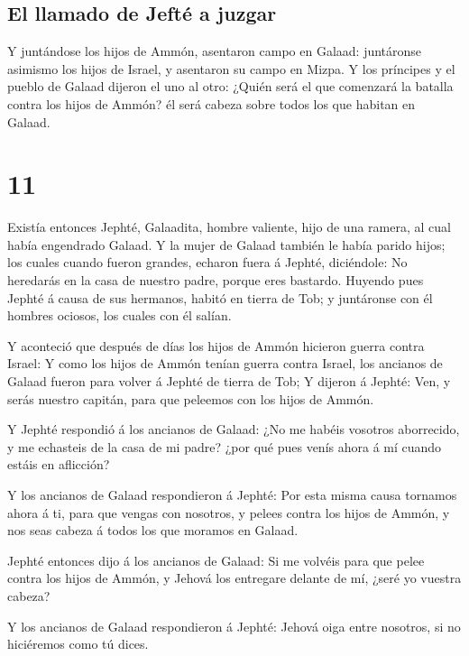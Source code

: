 \hypertarget{el-llamado-de-jeftuxe9-a-juzgar}{%
\subsection{El llamado de Jefté a
juzgar}\label{el-llamado-de-jeftuxe9-a-juzgar}}

 Y juntándose los hijos de Ammón, asentaron campo en
Galaad: juntáronse asimismo los hijos de Israel, y asentaron su campo en
Mizpa.  Y los príncipes y el pueblo de Galaad dijeron el
uno al otro: ¿Quién será el que comenzará la batalla contra los hijos de
Ammón? él será cabeza sobre todos los que habitan en Galaad.

\hypertarget{section-10}{%
\section{11}\label{section-10}}

 Existía entonces Jephté, Galaadita, hombre valiente, hijo
de una ramera, al cual había engendrado Galaad.  Y la
mujer de Galaad también le había parido hijos; los cuales cuando fueron
grandes, echaron fuera á Jephté, diciéndole: No heredarás en la casa de
nuestro padre, porque eres bastardo.  Huyendo pues Jephté
á causa de sus hermanos, habitó en tierra de Tob; y juntáronse con él
hombres ociosos, los cuales con él salían.

 Y aconteció que después de días los hijos de Ammón
hicieron guerra contra Israel:  Y como los hijos de Ammón
tenían guerra contra Israel, los ancianos de Galaad fueron para volver á
Jephté de tierra de Tob;  Y dijeron á Jephté: Ven, y serás
nuestro capitán, para que peleemos con los hijos de Ammón.

 Y Jephté respondió á los ancianos de Galaad: ¿No me
habéis vosotros aborrecido, y me echasteis de la casa de mi padre? ¿por
qué pues venís ahora á mí cuando estáis en aflicción?

 Y los ancianos de Galaad respondieron á Jephté: Por esta
misma causa tornamos ahora á ti, para que vengas con nosotros, y pelees
contra los hijos de Ammón, y nos seas cabeza á todos los que moramos en
Galaad.

 Jephté entonces dijo á los ancianos de Galaad: Si me
volvéis para que pelee contra los hijos de Ammón, y Jehová los entregare
delante de mí, ¿seré yo vuestra cabeza?

 Y los ancianos de Galaad respondieron á Jephté: Jehová
oiga entre nosotros, si no hiciéremos como tú dices.

